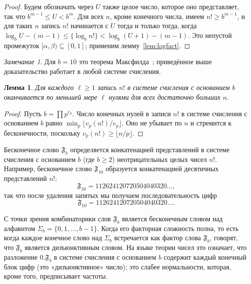 \documentclass[a4paper,14pt]{extreport}
\theoremstyle{plain}
\newtheorem{lemma}{Лемма}[section]
\theoremstyle{definition}
\theoremstyle{remark}
\newtheorem{remark}{Замечание}
\begin{document}
\begin{proof}
	Будем обозначать через $U$ также целое число, которое оно представляет, так что $b^{m-1}\le U<b^m$. Для всех $n$, кроме конечного числа, имеем $n!\ge b^{m-1}$, и для таких $n$ запись $n!$ начинается с $U$ тогда и только тогда, когда
	$\log_bU-(m-1)\le\{\log_b n!\}<\log_b(U+1)-(m-1)$.
	Это непустой промежуток $[\alpha,\beta)\subseteq[0,1]$; применим лемму~\ref{lem:logfact}.
\end{proof}

\begin{remark}
	Для $b=10$ это теорема Максфилда~\cite{Maxfield}; приведённое выше доказательство работает в любой системе счисления.
\end{remark}

\begin{lemma}\label{lem:trail}
	Для каждого $\ell\ge1$ запись $n!$ в системе счисления с основанием $b$ оканчивается по меньшей мере $\ell$ нулями для всех достаточно больших $n$.
\end{lemma}

\begin{proof}
	Пусть $b=\prod p^{e_p}$. Число конечных нулей в записи $n!$ в системе счисления с основанием $b$ равно $\min_p\lfloor v_p(n!)/e_p\rfloor$. Оно не убывает по $n$ и стремится к бесконечности, поскольку $v_p(n!)\ge\lfloor n/p\rfloor$.
\end{proof}

Бесконечное слово $\mathfrak{F}_{b}$ определяется конкатенацией представлений в системе счисления с основанием $b$ (где $b \geq 2$) неотрицательных целых чисел $n!$. Например, бесконечное слово $\mathfrak{F}_{10}$ образуется конкатенацией десятичных представлений $n!$:
\begin{equation}
	\mathfrak{F}_{10} = 1 1 2 6 24 120 720 5040 40320 \dots,
\end{equation}
так что после удаления запятых мы получаем последовательность цифр
\begin{equation}
	\mathfrak{F}_{10} = 112624120720504040320\dots.
\end{equation}

С точки зрения комбинаторики слов $\mathfrak{F}_{b}$ является бесконечным словом над алфавитом $\Sigma_{b} = \{0,1,\dots,b-1\}$. Когда его факторная сложность полна, то есть когда каждое конечное слово над $\Sigma_{b}$ встречается как фактор слова $\mathfrak{F}_{b}$, говорят, что $\mathfrak{F}_{b}$ является дизъюнктивным словом. На языке теории чисел это означает, что разложение $0.\mathfrak F_b$ в системе счисления с основанием $b$ содержит каждый конечный блок цифр (это «дизъюнктивное» число); это слабее нормальности, которая, кроме того, предписывает частоты.
\end{document}
